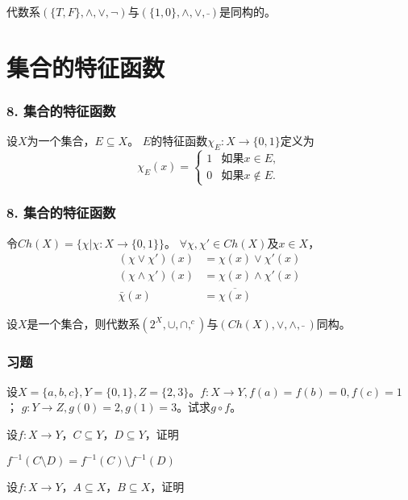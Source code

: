 \documentclass{beamer}
\begin{document}
\begin{CJK*}{UTF8}{gbsn}
\begin{frame}
代数系$(\{T,F\},\land,\lor,\lnot)$与$(\{1,0\},\land, \lor,\bar{ })$是同构的。
\end{frame}

\section{集合的特征函数}
\begin{frame}
  \frametitle{8. 集合的特征函数}
  \begin{Def}
    设$X$为一个集合，$E \subseteq X$。 $E$的\alert{特征函数}$\chi_E:X\to \{0,1\}$定义为
    \begin{equation*}
      \chi_E(x)=
      \begin{cases}
        1 & \text{如果} x \in E,\\
        0 & \text{如果} x \notin E.
      \end{cases}
    \end{equation*}
  \end{Def}
\end{frame}
\begin{frame}
  \frametitle{8. 集合的特征函数}
  \begin{Def}
    令$Ch(X) = \{\chi |\chi:X \to \{0,1\}\}$。
    $\forall \chi, \chi' \in Ch(X)$及$x \in X$，
    \begin{align}
      (\chi \lor \chi')(x) &= \chi(x) \lor \chi'(x)\nonumber\\
      (\chi \land \chi')(x) &= \chi(x) \land \chi'(x)\nonumber\\
      \bar{\chi}(x) &=   \overline{\chi(x)}
    \end{align}
  \end{Def}
  \begin{Thm}
    设$X$是一个集合，则代数系$(2^X, \cup, \cap, ^c)$与$(Ch(X), \lor, \land, \bar{} \ )$同构。
  \end{Thm}
\end{frame}

\begin{frame}
  \frametitle{习题}
    \begin{Exercise}
  设$X=\{a,b,c\}, Y=\{0,1\}, Z=\{2,3\}$。$f:X \to Y, f(a) = f(b) = 0, f(c) = 1$；
  $g:Y\to Z, g(0) = 2, g(1) = 3$。试求$g\circ f$。
  \end{Exercise}
  \begin{Exercise}
    设$f:X \to Y$，$C \subseteq Y$，$D \subseteq Y$，证明

    $f^{-1}(C \setminus D) = f^{-1}(C) \setminus f^{-1}(D)$
  \end{Exercise}
    \begin{Exercise}
    设$f:X \to Y$，$A \subseteq X$，$B \subseteq X$，证明


\end{Exercise}
\end{frame}
\end{CJK*}
\end{document}
